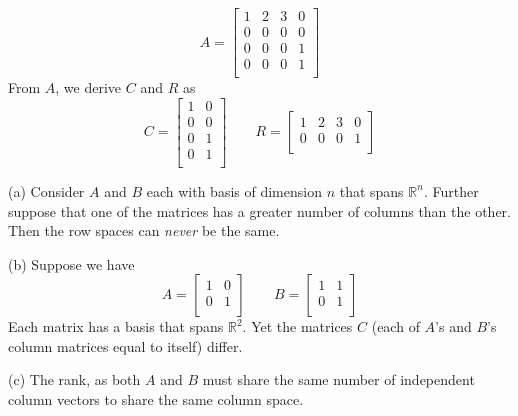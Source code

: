 \documentclass[a4paper]{article}
\begin{document}
\[
	A = 
	\begin{bmatrix}
		1 & 2 & 3 & 0 \\
		0 & 0 & 0 & 0 \\
		0 & 0 & 0 & 1 \\
		0 & 0 & 0 & 1 \\
	\end{bmatrix}
\]
From \(A\), we derive \(C\) and \(R\) as
\[
	C =
	\begin{bmatrix}
		1 & 0 \\
		0 & 0 \\
		0 & 1 \\
		0 & 1 \\
	\end{bmatrix}
\qquad
	R = 
	\begin{bmatrix}
		1 & 2 & 3 & 0 \\
		0 & 0 & 0 & 1 \\
	\end{bmatrix}
\]


(a) Consider \(A\) and \(B\) each with basis of dimension \(n\) that spans \(\mathbb{R}^{n}\). Further suppose that one of the matrices has a greater number of columns than the other. Then the row spaces can \textit{never} be the same.

(b) Suppose we have
\[
	A = 
	\begin{bmatrix}
		1 & 0 \\
		0 & 1 \\
	\end{bmatrix}
	\qquad
	B = 
	\begin{bmatrix}
		1 & 1 \\
		0 & 1 \\
	\end{bmatrix}
\]
Each matrix has a basis that spans \(\mathbb{R}^{2}\). Yet the matrices \(C\) (each of \(A\)'s and \(B\)'s column matrices equal to itself) differ.

(c) The rank, as both \(A\) and \(B\) must share the same number of independent column vectors to share the same column space.
\end{document}
